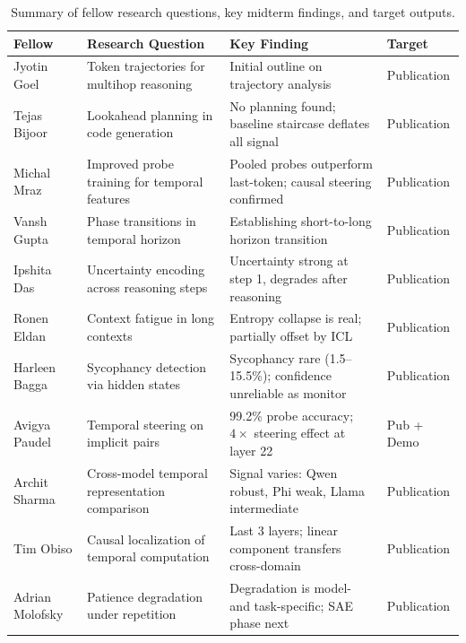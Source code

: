 \documentclass[midterm]{sparreport}
\begin{document}
\begin{table}[htbp]
\centering
\small
\begin{tabular}{p{2.2cm}p{4.5cm}p{4.5cm}p{2cm}}
\toprule
\textbf{Fellow} & \textbf{Research Question} & \textbf{Key Finding} & \textbf{Target} \\
\midrule
Jyotin Goel & Token trajectories for multihop reasoning & Initial outline on trajectory analysis & Publication \\
Tejas Bijoor & Lookahead planning in code generation & No planning found; baseline staircase deflates all signal & Publication \\
Michal Mraz & Improved probe training for temporal features & Pooled probes outperform last-token; causal steering confirmed & Publication \\
Vansh Gupta & Phase transitions in temporal horizon & Establishing short-to-long horizon transition & Publication \\
Ipshita Das & Uncertainty encoding across reasoning steps & Uncertainty strong at step 1, degrades after reasoning & Publication \\
Ronen Eldan & Context fatigue in long contexts & Entropy collapse is real; partially offset by ICL & Publication \\
Harleen Bagga & Sycophancy detection via hidden states & Sycophancy rare (1.5--15.5\%); confidence unreliable as monitor & Publication \\
Avigya Paudel & Temporal steering on implicit pairs & 99.2\% probe accuracy; $4\times$ steering effect at layer 22 & Pub + Demo \\
Archit Sharma & Cross-model temporal representation comparison & Signal varies: Qwen robust, Phi weak, Llama intermediate & Publication \\
Tim Obiso & Causal localization of temporal computation & Last 3 layers; linear component transfers cross-domain & Publication \\
Adrian Molofsky & Patience degradation under repetition & Degradation is model- and task-specific; SAE phase next & Publication \\
\bottomrule
\end{tabular}
\caption{Summary of fellow research questions, key midterm findings, and target outputs.}
\label{tab:fellows}
\end{table}

\end{document}
